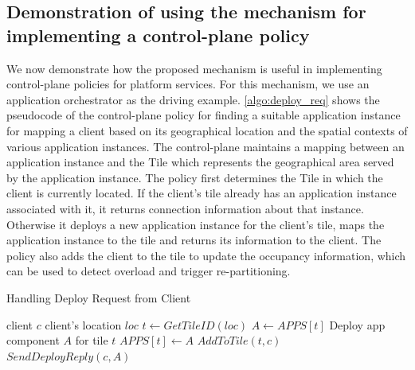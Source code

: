 \subsection{Demonstration of using the mechanism for implementing a control-plane policy}
We now demonstrate how the proposed mechanism is useful in implementing control-plane policies for platform services. For this mechanism, we use an application orchestrator as the driving example. \cref{algo:deploy_req} shows the pseudocode of the control-plane policy for finding a suitable application instance for mapping a client based on its geographical location and the spatial contexts of various application instances. The control-plane maintains a mapping between an application instance and the Tile which represents the geographical area served by the application instance. The policy first determines the Tile in which the client is currently located. If the client's tile already has an application instance associated with it, it returns connection information about that instance. Otherwise it deploys a new application instance for the client's tile, maps the application instance to the tile and returns its information to the client. The policy also adds the client to the tile to update the occupancy information, which can be used to detect overload and trigger re-partitioning.
\begin{algorithm}
\caption{Handling Deploy Request from Client}
\begin{algorithmic}
\Require client $c$
\Require client's location $loc$
\State $t \gets GetTileID \left( loc \right)$
    \State $A \gets APPS \left[ t \right]$
\Else
    \State Deploy app component $A$ for tile $t$
    \State $APPS  \left[ t \right] \gets A$
\EndIf
\State $AddToTile \left(t, c \right)$
\State $SendDeployReply \left(c, A \right)$
\end{algorithmic}
\label{algo:deploy_req}
\end{algorithm}

